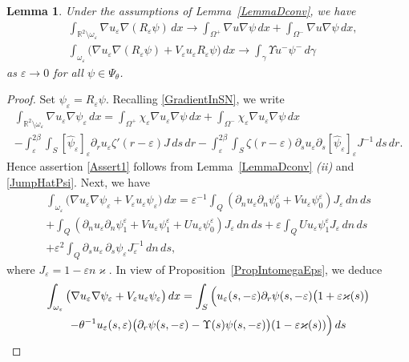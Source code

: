 \documentclass[reqno]{amsart}
\theoremstyle{plain}
\newtheorem{lem}{Lemma}
\numberwithin{equation}{section}
\renewcommand{\kappa}{\varkappa}
\newcommand{\Real}{\mathbb R}
\newcommand{\eps}{\varepsilon}
\begin{document}
\begin{lem}\label{LemmaGradUepsConv}
Under the assumptions of Lemma~\ref{LemmaDconv}, we have
  \begin{align}\label{Assert1}
    &\int_{\Real^2\setminus\omega_\eps}\nabla u_\eps \nabla (R_\eps\psi)\,dx\to
     \int_{\Omega^+}\nabla u \nabla \psi\,dx+\int_{\Omega^-}\nabla u \nabla \psi\,dx,
     \\\label{Assert2}
  &\int_{\omega_\eps}\big(\nabla u_\eps \nabla (R_\eps\psi)+  V_\eps u_\eps R_\eps\psi\big)\,dx\to \int_\gamma \Upsilon u^- \psi^-\,d\gamma
  \end{align}
  as $\eps\to 0$ for all $\psi\in \Psi_\theta$.
\end{lem}
\begin{proof}
Set $\psi_\eps=R_\eps \psi$.
Recalling \eqref{GradientInSN}, we write
\begin{multline*}
  \int_{\Real^2\setminus\omega_\eps}\nabla u_\eps \nabla \psi_\eps\,dx=
  \int_{\Omega^+}\chi_\eps\nabla u_\eps \nabla \psi\,dx
  +\int_{\Omega^-}\chi_\eps\nabla u_\eps \nabla \psi\,dx\\
  -\int_\eps^{2\beta}\int_S [\hat{\psi}_\eps]_{\eps}\partial_ru_\eps \zeta'(r-\eps)J\,ds\,dr-
  \int_\eps^{2\beta}\int_S \zeta(r-\eps)\partial_su_\eps\partial_s[\hat{\psi}_\eps]_{\eps} J^{-1}\,ds\,dr.
\end{multline*}
Hence  assertion \eqref{Assert1} follows from  Lemma~\ref{LemmaDconv} \textit{(ii)} and \eqref{JumpHatPsi}.
Next, we have
 \begin{multline*}
     \int_{\omega_\eps}\big(\nabla u_\eps \nabla \psi_\eps+  V_\eps u_\eps \psi_\eps\big)\,dx
     =\eps^{-1}\int_Q (\partial_n u_\eps \partial_n \psi_0^\eps+Vu_\eps \psi_0^\eps)J_\eps\,dn\,ds
     \\+\int_Q  (\partial_n u_\eps\partial_n \psi_1^\eps+Vu_\eps \psi_1^\eps+Uu_\eps \psi_0^\eps)J_\eps\,dn\,ds
     +\eps\int_Q U u_\eps \psi_1^\eps J_\eps\,dn\,ds
     \\+\eps^2\int_Q \partial_s u_\eps \,\partial_s \psi_\eps J_\eps^{-1} \,dn\,ds,
  \end{multline*}
 where $J_\eps=1-\eps n \kappa$. In view of Proposition~\ref{PropIntomegaEps}, we deduce
  \begin{multline}\allowdisplaybreaks
  \label{IntOmegaEpsTo}
     \int_{\omega_\eps}\big(\nabla u_\eps \nabla \psi_\eps+  V_\eps u_\eps \psi_\eps\big)\,dx
     = \int_S \Big(u_\eps(s,-\eps)\partial_r \psi(s,-\eps)\big(1+\eps \kappa(s)\big)
    \\
    -
    \theta^{-1}u_\eps(s,\eps)\big(\partial_r\psi(s,-\eps)-\Upsilon(s)\psi(s,-\eps)\big)(1-\eps \kappa(s))\Big)\,ds

\end{multline}
\end{proof}
\end{document}
